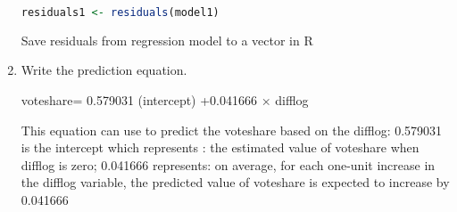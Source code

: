 \documentclass[12pt,letterpaper]{article}
\begin{document}
\begin{enumerate}
\begin{lstlisting}[language=R] 
residuals1 <- residuals(model1)
\end{lstlisting} 
Save residuals from regression model to a vector in R

\item Write the prediction equation.

\vspace{0.5cm}
voteshare= 0.579031 (intercept) +0.041666 × difflog

This equation can use to predict the voteshare based on the difflog: 0.579031 is the intercept which represents : the estimated value of voteshare when difflog is zero; 0.041666 represents:  on average, for each one-unit increase in the difflog variable, the  predicted value of voteshare is expected to increase by 0.041666

  
	\end{enumerate}
	
\newpage
\end{document}
